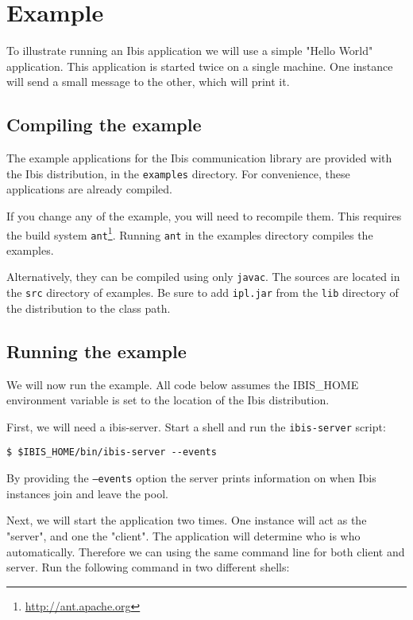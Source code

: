 \documentclass[a4paper,10pt]{article}
\begin{document}
\section{Example}

To illustrate running an Ibis application we will use a simple "Hello
World" application. This application is started twice on a single
machine. One instance will send a small message to the other, which will
print it.

\subsection{Compiling the example}

The example applications for the Ibis communication library are
provided with the Ibis distribution, in the \texttt{examples} directory.
For convenience, these applications are already compiled. 

If you change any of the example, you will need to recompile them. This 
requires the build system \texttt{ant}\footnote{\url{http://ant.apache.org}}. 
Running \texttt{ant} in the examples directory compiles the examples.

Alternatively, they can be compiled using only \texttt{javac}. The sources are
located in the \texttt{src} directory of examples. Be sure to add \texttt{ipl.jar} 
from the \texttt{lib} directory of the distribution to the class path.

\subsection{Running the example}

We will now run the example. All code below assumes the IBIS\_HOME
environment variable is set to the location of the Ibis distribution.

First, we will need a ibis-server. Start a shell and
run the \texttt{ibis-server} script:
\noindent
{\small
\begin{verbatim}
$ $IBIS_HOME/bin/ibis-server --events
\end{verbatim}
}
\noindent

By providing the \texttt{--events} option the server 
prints information on when Ibis instances join and leave the pool.

Next, we will start the application two times. One instance will act as the
"server", and one the "client". The application will determine who is who
automatically. Therefore we can using the same command line for both client 
and server. Run the following command in two different shells:
\end{document}
